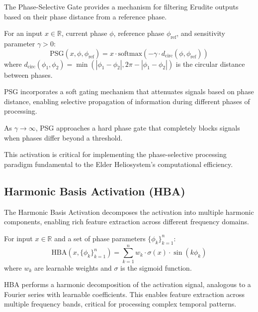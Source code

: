 The Phase-Selective Gate provides a mechanism for filtering Erudite outputs based on their phase distance from a reference phase.

\begin{definition}
For an input $x \in \mathbb{R}$, current phase $\phi$, reference phase $\phi_{\text{ref}}$, and sensitivity parameter $\gamma > 0$:
\begin{equation}
\text{PSG}(x, \phi, \phi_{\text{ref}}) = x \cdot \text{softmax}(-\gamma \cdot d_{\text{circ}}(\phi, \phi_{\text{ref}}))
\end{equation}
where $d_{\text{circ}}(\phi_1, \phi_2) = \min(|\phi_1 - \phi_2|, 2\pi - |\phi_1 - \phi_2|)$ is the circular distance between phases.
\end{definition}

PSG incorporates a soft gating mechanism that attenuates signals based on phase distance, enabling selective propagation of information during different phases of processing.

\begin{observation}
As $\gamma \to \infty$, PSG approaches a hard phase gate that completely blocks signals when phases differ beyond a threshold.
\end{observation}

This activation is critical for implementing the phase-selective processing paradigm fundamental to the Elder Heliosystem's computational efficiency.

\subsection{Harmonic Basis Activation (HBA)}

The Harmonic Basis Activation decomposes the activation into multiple harmonic components, enabling rich feature extraction across different frequency domains.

\begin{definition}
For input $x \in \mathbb{R}$ and a set of phase parameters $\{\phi_k\}_{k=1}^n$:
\begin{equation}
\text{HBA}(x, \{\phi_k\}_{k=1}^n) = \sum_{k=1}^n w_k \cdot \sigma(x) \cdot \sin(k\phi_k)
\end{equation}
where $w_k$ are learnable weights and $\sigma$ is the sigmoid function.
\end{definition}

HBA performs a harmonic decomposition of the activation signal, analogous to a Fourier series with learnable coefficients. This enables feature extraction across multiple frequency bands, critical for processing complex temporal patterns.

